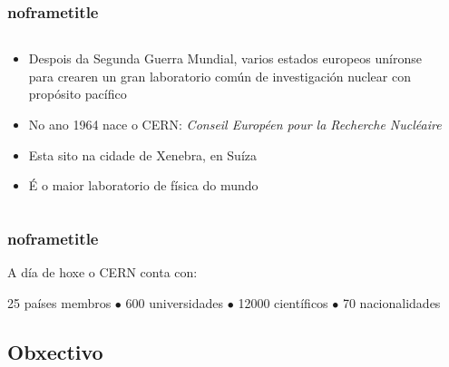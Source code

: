 \documentclass{beamer}
\begin{document}
\begin{frame}
  \frametitle{noframetitle}

  \begin{columns}
  \begin{column}{0.6\textwidth}
  \begin{itemize}
    \item Despois da Segunda Guerra Mundial, varios estados europeos uníronse para
    crearen un gran laboratorio común de investigación nuclear con propósito
    pacífico
    \item No ano 1964 nace o CERN: \emph{Conseil Européen pour la Recherche Nucléaire}
    \item Esta sito na cidade de Xenebra, en Suíza
    \item É o maior laboratorio de física do mundo
    \end{itemize}
  \end{column}
  \begin{column}{0.35\textwidth}
  \end{column}
  \end{columns}

\end{frame}



\begin{frame}[default, b, backgroundpicture=gpx/all_cern_states.pdf]
  \frametitle{noframetitle}
  A día de hoxe o CERN conta con:

  25 países membros {\color{scqblue} $\bullet$} 
  600 universidades {\color{scqblue} $\bullet$} 
  12000 científicos {\color{scqblue} $\bullet$} 
  70 nacionalidades
\end{frame}



\subsection{Obxectivo}
\end{document}
